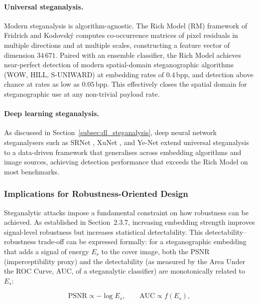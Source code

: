 \documentclass[12pt,a4paper,oneside]{report}
\begin{document}
	\paragraph{Universal steganalysis.}
	Modern steganalysis is algorithm-agnostic. The Rich Model (RM) framework of Fridrich and
	Kodovský \cite{Fridrich2012} computes co-occurrence matrices of pixel residuals in multiple
	directions and at multiple scales, constructing a feature vector of dimension $34\,671$.
	Paired with an ensemble classifier, the Rich Model achieves near-perfect detection of
	modern spatial-domain steganographic algorithms (WOW, HILL, S-UNIWARD) at embedding rates
	of $0.4$\,bpp, and detection above chance at rates as low as $0.05$\,bpp. This effectively
	closes the spatial domain for steganographic use at any non-trivial payload rate.
	
	\paragraph{Deep learning steganalysis.}
	As discussed in Section~\ref{subsec:dl_steganalysis}, deep neural network steganalysers
	such as SRNet \cite{boroumand2019deep}, XuNet \cite{xu2016structural}, and Ye-Net
	\cite{yedroudj2018yenet} extend universal steganalysis to a data-driven framework that
	generalises across embedding algorithms and image sources, achieving detection performance
	that exceeds the Rich Model on most benchmarks.
	
	\subsubsection{Implications for Robustness-Oriented Design}
	
	Steganalytic attacks impose a fundamental constraint on how robustness can be achieved.
	As established in Section~2.3.7, increasing embedding strength improves signal-level
	robustness but increases statistical detectability. This detectability--robustness trade-off
	can be expressed formally: for a steganographic embedding that adds a signal of energy
	$E_s$ to the cover image, both the PSNR (imperceptibility proxy) and the detectability
	(as measured by the Area Under the ROC Curve, AUC, of a steganalytic classifier) are
	monotonically related to $E_s$:
	
	\begin{equation}
		\text{PSNR} \propto -\log E_s, \qquad
		\text{AUC} \propto f(E_s),
		\label{eq:detectability_tradeoff}
	\end{equation}
	
\end{document}
